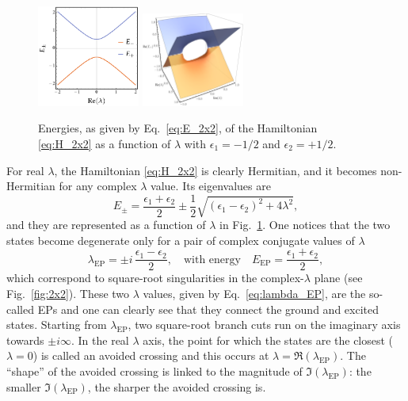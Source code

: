 \documentclass[11pt,a4paper]{article}
\begin{document}
\begin{figure}
    \centering
    \includegraphics[width=0.3\textwidth]{2x2.pdf}
    \hspace{0.2\textwidth}
    \includegraphics[width=0.3\textwidth]{i2x2.pdf}
    \caption{Energies, as given by Eq.~\ref{eq:E_2x2}, of the Hamiltonian \eqref{eq:H_2x2} as a function of $\lambda$ with $\epsilon_1 = -1/2$ and $\epsilon_2 = +1/2$.}
    \label{fig:2x2}
\end{figure}

For real $\lambda$, the Hamiltonian \eqref{eq:H_2x2} is clearly Hermitian, and it becomes non-Hermitian for any complex $\lambda$ value.
Its eigenvalues are
\begin{equation}
\label{eq:E_2x2}
	E_{\pm} = \frac{\epsilon_1 + \epsilon_2}{2} \pm \frac{1}{2} \sqrt{(\epsilon_1 - \epsilon_2)^2 + 4\lambda^2},
\end{equation}
and they are represented as a function of $\lambda$ in Fig.~\ref{fig:2x2}.
One notices that the two states become degenerate only for a pair of complex conjugate values of $\lambda$
\begin{equation}
\label{eq:lambda_EP}
	\lambda_\text{EP} = \pm i\,\frac{\epsilon_1 - \epsilon_2}{2},
	\quad
	\text{with energy}	
	\quad
	E_\text{EP} = \frac{\epsilon_1 + \epsilon_2}{2},
\end{equation}
which correspond to square-root singularities in the complex-$\lambda$ plane (see Fig.~\eqref{fig:2x2}).
These two $\lambda$ values, given by Eq.~\eqref{eq:lambda_EP}, are the so-called EPs and one can clearly see that they connect the ground and excited states.
Starting from $\lambda_\text{EP}$, two square-root branch cuts run on the imaginary axis towards $\pm i \infty$.
In the real $\lambda$ axis, the point for which the states are the closest ($\lambda = 0$) is called an avoided crossing and this occurs at $\lambda = \Re(\lambda_\text{EP})$.
The ``shape'' of the avoided crossing is linked to the magnitude of $\Im(\lambda_\text{EP})$: the smaller $\Im(\lambda_\text{EP})$, the sharper the avoided crossing is.
\end{document}
